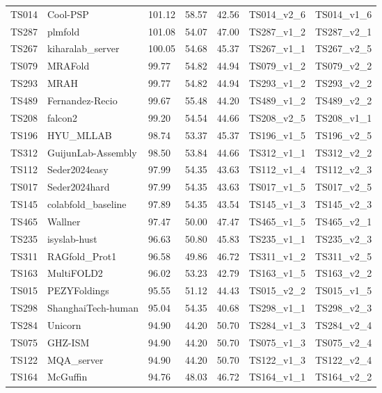 \begin{longtable}{lllllll}
TS014 & Cool-PSP & 101.12 & 58.57 & 42.56 & TS014\_v2\_6 & TS014\_v1\_6 \\ 
TS287 & plmfold & 101.08 & 54.07 & 47.00 & TS287\_v1\_2 & TS287\_v2\_1 \\ 
TS267 & kiharalab\_server & 100.05 & 54.68 & 45.37 & TS267\_v1\_1 & TS267\_v2\_5 \\ 
TS079 & MRAFold & 99.77 & 54.82 & 44.94 & TS079\_v1\_2 & TS079\_v2\_2 \\ 
TS293 & MRAH & 99.77 & 54.82 & 44.94 & TS293\_v1\_2 & TS293\_v2\_2 \\ 
TS489 & Fernandez-Recio & 99.67 & 55.48 & 44.20 & TS489\_v1\_2 & TS489\_v2\_2 \\ 
TS208 & falcon2 & 99.20 & 54.54 & 44.66 & TS208\_v2\_5 & TS208\_v1\_1 \\ 
TS196 & HYU\_MLLAB & 98.74 & 53.37 & 45.37 & TS196\_v1\_5 & TS196\_v2\_5 \\ 
TS312 & GuijunLab-Assembly & 98.50 & 53.84 & 44.66 & TS312\_v1\_1 & TS312\_v2\_2 \\ 
TS112 & Seder2024easy & 97.99 & 54.35 & 43.63 & TS112\_v1\_4 & TS112\_v2\_3 \\ 
TS017 & Seder2024hard & 97.99 & 54.35 & 43.63 & TS017\_v1\_5 & TS017\_v2\_5 \\ 
TS145 & colabfold\_baseline & 97.89 & 54.35 & 43.54 & TS145\_v1\_3 & TS145\_v2\_3 \\ 
TS465 & Wallner & 97.47 & 50.00 & 47.47 & TS465\_v1\_5 & TS465\_v2\_1 \\ 
TS235 & isyslab-hust & 96.63 & 50.80 & 45.83 & TS235\_v1\_1 & TS235\_v2\_3 \\ 
TS311 & RAGfold\_Prot1 & 96.58 & 49.86 & 46.72 & TS311\_v1\_2 & TS311\_v2\_5 \\ 
TS163 & MultiFOLD2 & 96.02 & 53.23 & 42.79 & TS163\_v1\_5 & TS163\_v2\_2 \\ 
TS015 & PEZYFoldings & 95.55 & 51.12 & 44.43 & TS015\_v2\_2 & TS015\_v1\_5 \\ 
TS298 & ShanghaiTech-human & 95.04 & 54.35 & 40.68 & TS298\_v1\_1 & TS298\_v2\_3 \\ 
TS284 & Unicorn & 94.90 & 44.20 & 50.70 & TS284\_v1\_3 & TS284\_v2\_4 \\ 
TS075 & GHZ-ISM & 94.90 & 44.20 & 50.70 & TS075\_v1\_3 & TS075\_v2\_4 \\ 
TS122 & MQA\_server & 94.90 & 44.20 & 50.70 & TS122\_v1\_3 & TS122\_v2\_4 \\ 
TS164 & McGuffin & 94.76 & 48.03 & 46.72 & TS164\_v1\_1 & TS164\_v2\_2 \\ 

\end{longtable}
